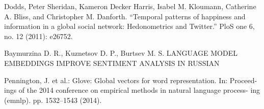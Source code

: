 \documentclass{article}
\begin{document}
\begin{thebibliography}{1}
\newblock Dodds, Peter Sheridan, Kameron Decker Harris, Isabel M. Kloumann, Catherine A. Bliss,
and Christopher M. Danforth. “Temporal patterns of happiness and information in a global
social network: Hedonometrics and Twitter.” PloS one 6, no. 12 (2011): e26752.

\newblock Baymurzina D. R., Kuznetsov D. P., Burtsev M. S.
\newblock LANGUAGE MODEL EMBEDDINGS IMPROVE SENTIMENT
ANALYSIS IN RUSSIAN

\newblock Pennington, J. et al.: Glove: Global vectors for word representation. In: Proceed- ings of the 2014 conference on empirical methods in natural language process- ing (emnlp). pp. 1532–1543 (2014).

\end{thebibliography}
\end{document}
